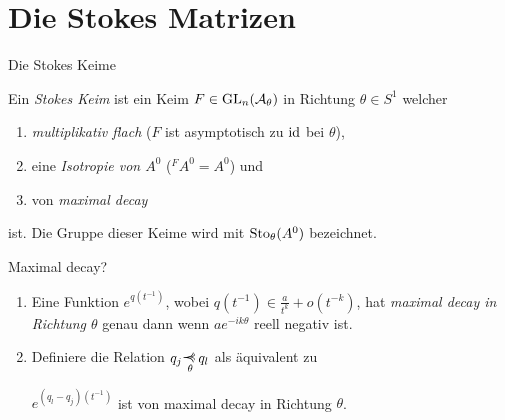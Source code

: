 \section{Die Stokes Matrizen}
\begin{frame}[t]{Die Stokes Keime}
  \begin{defn}
    Ein \emph{Stokes Keim} ist ein Keim $F\in\operatorname{GL}_n(\mathcal{A}_\theta)$ in Richtung
    $\theta\in S^1$ welcher
    \begin{enumerate}
    \item<1-> \emph{multiplikativ flach} ($F$ ist asymptotisch zu $\operatorname{id}$ bei $\theta$),
    \item<2-> eine \emph{Isotropie von \boldmath$A^0$} (${}^FA^0=A^0$) und
    \item<4-> von \emph{maximal decay} 
    \end{enumerate}
    ist. Die Gruppe dieser Keime wird mit $\operatorname{Sto}_\theta(A^0)$ bezeichnet.
  \end{defn}
\end{frame}
\begin{frame}[t]{Maximal decay?}
  \begin{defn}
    \begin{enumerate}
    \item<1-> Eine Funktion $e^{q(t^{-1})}$, wobei
      $q(t^{-1})\in\frac{a}{t^{k}}+o(t^{-k})$, hat \emph{maximal decay in
        Richtung \boldmath$\theta$} genau dann wenn $ae^{-ik\theta}$ reell
      negativ ist.
    \item<2-> Definiere die Relation $q_j\myrel{\theta}q_l$ als äquivalent zu
      \begin{einr}
        $e^{(q_l-q_j)(t^{-1})}$ ist von maximal decay in Richtung $\theta$.
      \end{einr}
    \end{enumerate}
  \end{defn}
\end{frame}
